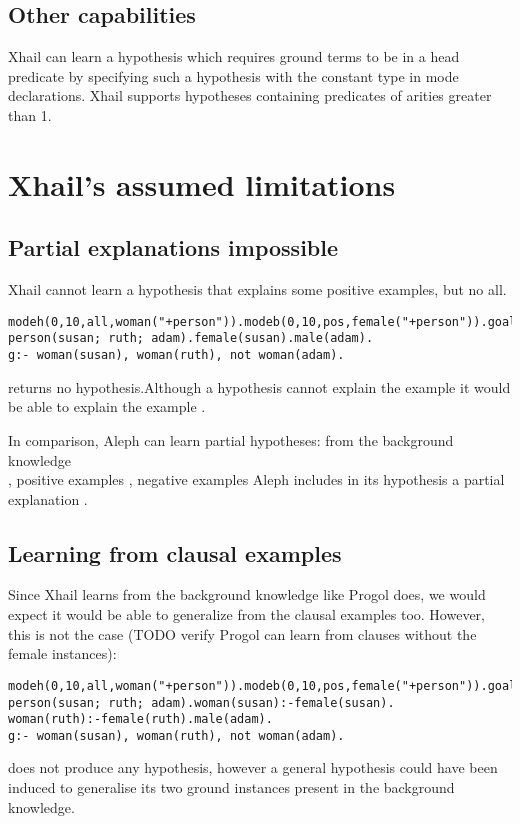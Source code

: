 \subsection{Other capabilities}
Xhail can learn a hypothesis which requires ground terms to be in a head predicate by specifying such a hypothesis with the constant type  in mode declarations. Xhail supports hypotheses containing predicates of arities greater than 1.

\section{Xhail's assumed limitations}

\subsection{Partial explanations impossible}
Xhail cannot learn a hypothesis that explains some positive examples, but no all.

\begin{lstlisting}
modeh(0,10,all,woman("+person")).modeb(0,10,pos,female("+person")).goal(g).
person(susan; ruth; adam).female(susan).male(adam).
g:- woman(susan), woman(ruth), not woman(adam).
\end{lstlisting}
returns no hypothesis.Although a hypothesis
 cannot explain the example  it would be able to explain the example .

In comparison, Aleph can learn partial hypotheses: from the background knowledge\\
, positive examples , negative examples  Aleph includes in its hypothesis a partial explanation
.

\subsection{Learning from clausal examples}
Since Xhail learns from the background knowledge like Progol does, we would expect it would be able to generalize from the clausal examples too. However, this is not the case (TODO verify Progol can learn from clauses without the female instances):

\begin{lstlisting}
modeh(0,10,all,woman("+person")).modeb(0,10,pos,female("+person")).goal(g).
person(susan; ruth; adam).woman(susan):-female(susan).
woman(ruth):-female(ruth).male(adam).
g:- woman(susan), woman(ruth), not woman(adam).
\end{lstlisting}
does not produce any hypothesis, however a general hypothesis
 could have been induced to generalise its two ground instances present in the background knowledge.

